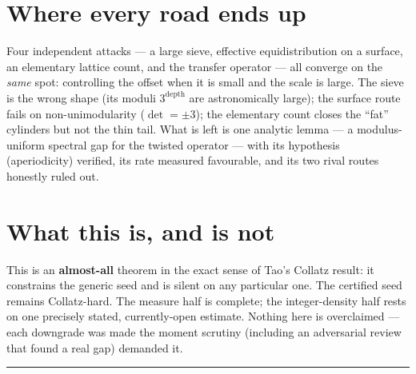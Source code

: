 \documentclass[11pt]{article}
\newcommand{\lead}[1]{{\color{acc}\textbf{#1}}}
\begin{document}
\section{Where every road ends up}
Four independent attacks --- a large sieve, effective equidistribution on a surface, an elementary lattice count, and the transfer operator --- all converge on the \emph{same} spot: controlling the offset when it is small and the scale is large. The sieve is the wrong shape (its moduli $3^{\text{depth}}$ are astronomically large); the surface route fails on non-unimodularity ($\det=\pm3$); the elementary count closes the ``fat'' cylinders but not the thin tail. What is left is one analytic lemma --- a modulus-uniform spectral gap for the twisted operator --- with its hypothesis (aperiodicity) verified, its rate measured favourable, and its two rival routes honestly ruled out.

\section{What this is, and is not}
This is an \lead{almost-all} theorem in the exact sense of Tao's Collatz result: it constrains the generic seed and is silent on any particular one. The certified seed remains Collatz-hard. The measure half is complete; the integer-density half rests on one precisely stated, currently-open estimate. Nothing here is overclaimed --- each downgrade was made the moment scrutiny (including an adversarial review that found a real gap) demanded it.

\vspace{4pt}\hrule\vspace{4pt}
\end{document}
